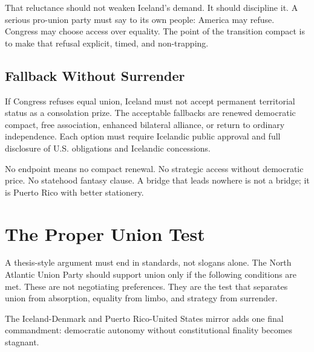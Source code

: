 \documentclass[11pt,a4paper]{article}
\newcommand{\PartyEN}{The North Atlantic Union Party}
\begin{document}
That reluctance should not weaken Iceland's demand. It should discipline it. A serious pro-union party must say to its own people: America may refuse. Congress may choose access over equality. The point of the transition compact is to make that refusal explicit, timed, and non-trapping.

\subsection{Fallback Without Surrender}
If Congress refuses equal union, Iceland must not accept permanent territorial status as a consolation prize. The acceptable fallbacks are renewed democratic compact, free association, enhanced bilateral alliance, or return to ordinary independence. Each option must require Icelandic public approval and full disclosure of U.S. obligations and Icelandic concessions.

No endpoint means no compact renewal. No strategic access without democratic price. No statehood fantasy clause. A bridge that leads nowhere is not a bridge; it is Puerto Rico with better stationery.

\section{The Proper Union Test}
A thesis-style argument must end in standards, not slogans alone. \PartyEN{} should support union only if the following conditions are met. These are not negotiating preferences. They are the test that separates union from absorption, equality from limbo, and strategy from surrender.

The Iceland-Denmark and Puerto Rico-United States mirror adds one final commandment: democratic autonomy without constitutional finality becomes stagnant.
\end{document}
